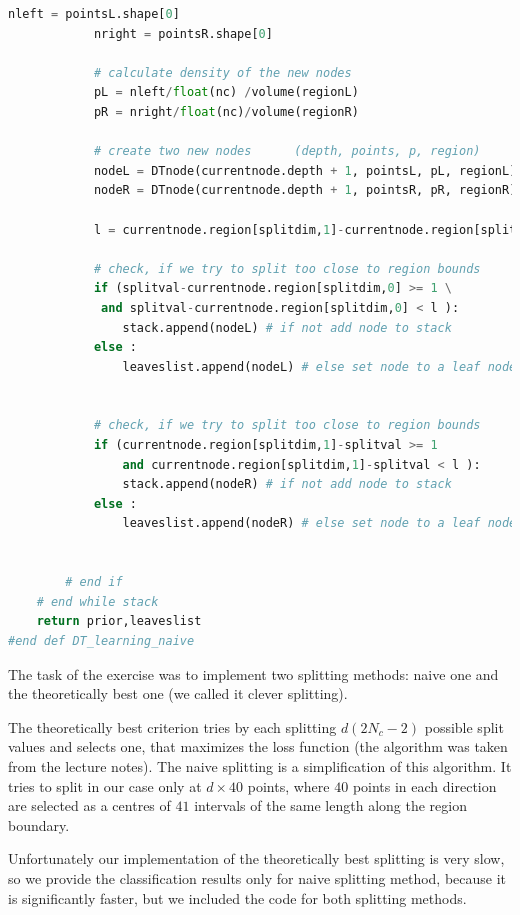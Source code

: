 \documentclass{article}
\begin{document}
\begin{lstlisting}[language=Python]
            nleft = pointsL.shape[0]                  
            nright = pointsR.shape[0]                
                    
            # calculate density of the new nodes
            pL = nleft/float(nc) /volume(regionL)
            pR = nright/float(nc)/volume(regionR)        
                                   
            # create two new nodes      (depth, points, p, region)
            nodeL = DTnode(currentnode.depth + 1, pointsL, pL, regionL)
            nodeR = DTnode(currentnode.depth + 1, pointsR, pR, regionR)

            l = currentnode.region[splitdim,1]-currentnode.region[splitdim,0]   
            
            # check, if we try to split too close to region bounds
            if (splitval-currentnode.region[splitdim,0] >= 1 \
             and splitval-currentnode.region[splitdim,0] < l ):
                stack.append(nodeL) # if not add node to stack                
            else :
                leaveslist.append(nodeL) # else set node to a leaf node

            
            # check, if we try to split too close to region bounds
            if (currentnode.region[splitdim,1]-splitval >= 1 
                and currentnode.region[splitdim,1]-splitval < l ):
                stack.append(nodeR) # if not add node to stack                
            else :
                leaveslist.append(nodeR) # else set node to a leaf node

                
        # end if        
    # end while stack
    return prior,leaveslist
#end def DT_learning_naive
\end{lstlisting}

The task of the exercise was to implement two splitting methods: naive one and the theoretically best one (we called it clever splitting). 

The theoretically best criterion tries by each splitting $d(2N_c-2)$ possible split values and selects one, that maximizes the loss function (the algorithm was taken from the lecture notes). The naive splitting is a simplification of this algorithm. It tries to split in our case only at $d\times 40$ points, where $40$ points in each direction are selected as a centres of $41$ intervals of the same length along the region boundary.

Unfortunately our implementation of the theoretically best splitting is very slow, so we provide the classification results only for naive splitting method, because it is significantly faster, but we included the code for both splitting methods.
\end{document}
